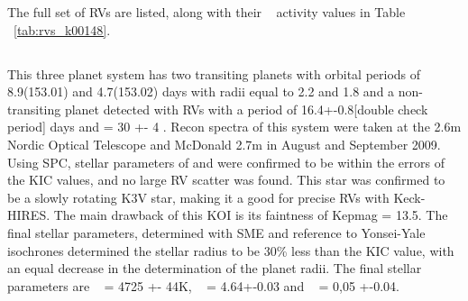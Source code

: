 \documentclass{emulateapj}
\begin{document}
The full set of RVs are listed, along with their \rphk~ activity values in Table ~\ref{tab:rvs_k00148}.





%



\subsection{\koionefivethree}  %

This three planet system has two transiting planets with orbital periods of 8.9(153.01) and 4.7(153.02) days with radii equal to 2.2 and 1.8 \rearth and a non-transiting planet detected with RVs with a period of 16.4+-0.8[double check period] days and \msini = 30 +- 4 .  Recon spectra of this system were taken at the 2.6m Nordic Optical Telescope  and McDonald 2.7m in August and September 2009. Using SPC, stellar parameters of \teff and \logg were confirmed to be within the errors of the KIC values, and no large RV scatter was found. This star was confirmed to be a slowly rotating K3V star, making it a good for precise RVs with Keck-HIRES. The main drawback of this KOI is its faintness of Kepmag = 13.5. The final stellar parameters, determined with SME and reference to Yonsei-Yale isochrones determined the stellar radius to be 30\% less than the KIC value, with an equal decrease in the determination of the planet radii.  The final stellar parameters are \teff~ = 4725 +- 44K, \logg~ = 4.64+-0.03 and \feh~ = 0,05 +-0.04. 
\end{document}
